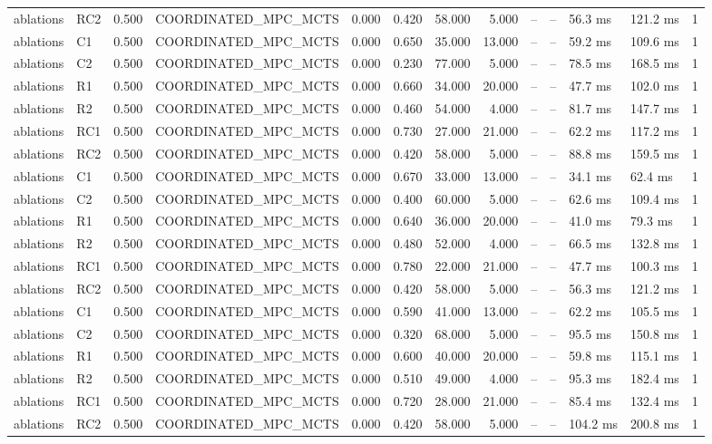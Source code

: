 \begin{table}
{\begin{tabular}{llrlrrrrrrllr}
ablations & RC2 & 0.500 & COORDINATED\_MPC\_MCTS & 0.000 & 0.420 & 58.000 & 5.000 & -- & -- & 56.3 ms & 121.2 ms & 1 \\
ablations & C1 & 0.500 & COORDINATED\_MPC\_MCTS & 0.000 & 0.650 & 35.000 & 13.000 & -- & -- & 59.2 ms & 109.6 ms & 1 \\
ablations & C2 & 0.500 & COORDINATED\_MPC\_MCTS & 0.000 & 0.230 & 77.000 & 5.000 & -- & -- & 78.5 ms & 168.5 ms & 1 \\
ablations & R1 & 0.500 & COORDINATED\_MPC\_MCTS & 0.000 & 0.660 & 34.000 & 20.000 & -- & -- & 47.7 ms & 102.0 ms & 1 \\
ablations & R2 & 0.500 & COORDINATED\_MPC\_MCTS & 0.000 & 0.460 & 54.000 & 4.000 & -- & -- & 81.7 ms & 147.7 ms & 1 \\
ablations & RC1 & 0.500 & COORDINATED\_MPC\_MCTS & 0.000 & 0.730 & 27.000 & 21.000 & -- & -- & 62.2 ms & 117.2 ms & 1 \\
ablations & RC2 & 0.500 & COORDINATED\_MPC\_MCTS & 0.000 & 0.420 & 58.000 & 5.000 & -- & -- & 88.8 ms & 159.5 ms & 1 \\
ablations & C1 & 0.500 & COORDINATED\_MPC\_MCTS & 0.000 & 0.670 & 33.000 & 13.000 & -- & -- & 34.1 ms & 62.4 ms & 1 \\
ablations & C2 & 0.500 & COORDINATED\_MPC\_MCTS & 0.000 & 0.400 & 60.000 & 5.000 & -- & -- & 62.6 ms & 109.4 ms & 1 \\
ablations & R1 & 0.500 & COORDINATED\_MPC\_MCTS & 0.000 & 0.640 & 36.000 & 20.000 & -- & -- & 41.0 ms & 79.3 ms & 1 \\
ablations & R2 & 0.500 & COORDINATED\_MPC\_MCTS & 0.000 & 0.480 & 52.000 & 4.000 & -- & -- & 66.5 ms & 132.8 ms & 1 \\
ablations & RC1 & 0.500 & COORDINATED\_MPC\_MCTS & 0.000 & 0.780 & 22.000 & 21.000 & -- & -- & 47.7 ms & 100.3 ms & 1 \\
ablations & RC2 & 0.500 & COORDINATED\_MPC\_MCTS & 0.000 & 0.420 & 58.000 & 5.000 & -- & -- & 56.3 ms & 121.2 ms & 1 \\
ablations & C1 & 0.500 & COORDINATED\_MPC\_MCTS & 0.000 & 0.590 & 41.000 & 13.000 & -- & -- & 62.2 ms & 105.5 ms & 1 \\
ablations & C2 & 0.500 & COORDINATED\_MPC\_MCTS & 0.000 & 0.320 & 68.000 & 5.000 & -- & -- & 95.5 ms & 150.8 ms & 1 \\
ablations & R1 & 0.500 & COORDINATED\_MPC\_MCTS & 0.000 & 0.600 & 40.000 & 20.000 & -- & -- & 59.8 ms & 115.1 ms & 1 \\
ablations & R2 & 0.500 & COORDINATED\_MPC\_MCTS & 0.000 & 0.510 & 49.000 & 4.000 & -- & -- & 95.3 ms & 182.4 ms & 1 \\
ablations & RC1 & 0.500 & COORDINATED\_MPC\_MCTS & 0.000 & 0.720 & 28.000 & 21.000 & -- & -- & 85.4 ms & 132.4 ms & 1 \\
ablations & RC2 & 0.500 & COORDINATED\_MPC\_MCTS & 0.000 & 0.420 & 58.000 & 5.000 & -- & -- & 104.2 ms & 200.8 ms & 1 \\
\bottomrule
\end{tabular}
}
\end{table}
